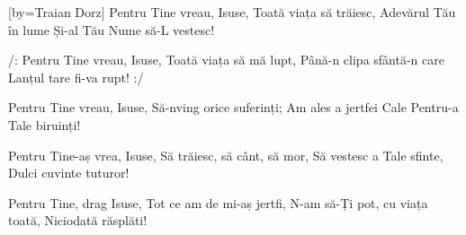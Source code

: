 [by={Traian Dorz}]
\beginverse
Pentru Tine vreau, Isuse,
Toată viața să trăiesc,
Adevărul Tău în lume
Și-al Tău Nume să-L vestesc!
\endverse

\beginchorus
/: Pentru Tine vreau, Isuse,
Toată viața să mă lupt,
Până-n clipa sfântă-n care
Lanțul tare fi-va rupt! :/
\endchorus

\beginverse
Pentru Tine vreau, Isuse,
Să-nving orice suferinți;
Am ales a jertfei Cale
Pentru-a Tale biruinți!
\endverse

\beginverse
Pentru Tine-aș vrea, Isuse,
Să trăiesc, să cânt, să mor,
Să vestesc a Tale sfinte,
Dulci cuvinte tuturor!
\endverse

\beginverse
Pentru Tine, drag Isuse,
Tot ce am de mi-aș jertfi,
N-am să-Ți pot, cu viața toată,
Niciodată răsplăti!
\endverse
\endsong